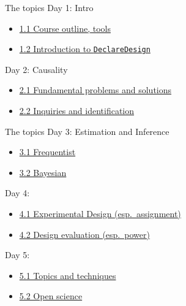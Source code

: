 \documentclass[
  11pt,
  ignorenonframetext,
]{beamer}
\providecommand{\tightlist}{%
  \setlength{\itemsep}{0pt}\setlength{\parskip}{0pt}}\usepackage{longtable,booktabs,array}
\begin{document}
\begin{frame}[fragile]{The topics}
\protect\hypertarget{the-topics}{}
Day 1: Intro

\begin{itemize}
\tightlist
\item
  \protect\hyperlink{secoutline}{1.1 Course outline, tools}
\item
  \protect\hyperlink{secdd}{1.2 Introduction to \texttt{DeclareDesign}}
\end{itemize}

Day 2: Causality

\begin{itemize}
\tightlist
\item
  \protect\hyperlink{seccausality}{2.1 Fundamental problems and
  solutions}
\item
  \protect\hyperlink{secestimands}{2.2 Inquiries and identification}
\end{itemize}
\end{frame}

\begin{frame}{The topics}
\protect\hypertarget{the-topics-1}{}
Day 3: Estimation and Inference

\begin{itemize}
\tightlist
\item
  \protect\hyperlink{secfisher}{3.1 Frequentist}
\item
  \protect\hyperlink{secbayes}{3.2 Bayesian}
\end{itemize}

Day 4:

\begin{itemize}
\tightlist
\item
  \protect\hyperlink{secdesign}{4.1 Experimental Design
  (esp.~assignment)}
\item
  \protect\hyperlink{secdiagnosis}{4.2 Design evaluation (esp.~power)}
\end{itemize}

Day 5:

\begin{itemize}
\tightlist
\item
  \protect\hyperlink{citopics}{5.1 Topics and techniques}
\item
  \protect\hyperlink{openscience}{5.2 Open science}
\end{itemize}
\end{frame}
\end{document}

